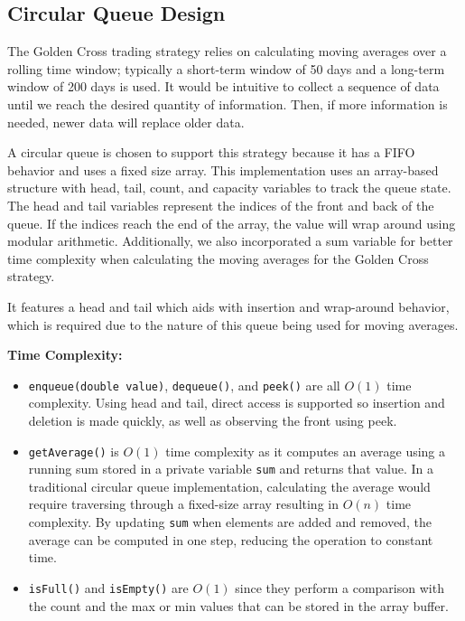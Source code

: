 \documentclass[12pt]{article}
\begin{document}
\subsection{Circular Queue Design}
The Golden Cross trading strategy relies on calculating moving averages over a rolling time window; typically a 
short-term window of 50 days and a long-term window of 200 days is used. 
It would be intuitive to collect a sequence of data until we reach the desired quantity of information. 
Then, if more information is needed, newer data will replace older data. 

A circular queue is chosen to support this strategy because it has a FIFO behavior and uses a fixed size array. 
This implementation uses an array-based structure with head, tail, count, and capacity variables to track the queue 
state. The head and tail variables represent the indices of the front and back of the queue. 
If the indices reach the end of the array, the value will wrap around using modular arithmetic. 
Additionally, we also incorporated a sum variable for better time complexity when calculating the moving averages 
for the Golden Cross strategy. 

It features a head and tail which aids with insertion and wrap-around behavior, which is required due to the nature 
of this queue being used for moving averages. 

\vspace{0.5cm}
{\large{\textbf{Time Complexity:}}}
\begin{itemize}
    \item \texttt{enqueue(double value)}, \texttt{dequeue()}, and \texttt{peek()} are all $O(1)$ time complexity. 
    Using head and tail, direct access is supported so insertion and deletion is made quickly, as well as observing 
    the front using peek. 
    \item \texttt{getAverage()} is $O(1)$ time complexity as it computes an average using a running sum stored in a 
    private variable \texttt{sum} and returns that value. 
    In a traditional circular queue implementation, calculating the average would require traversing through a 
    fixed-size array resulting in $O(n)$ time complexity. 
    By updating \texttt{sum} when elements are added and removed, the average can be computed in one step, reducing 
    the operation to constant time. 
    \item \texttt{isFull()} and \texttt{isEmpty()} are $O(1)$ since they perform a comparison with the count and the 
    max or min values that can be stored in the array buffer. 
\end{itemize}
\end{document}
